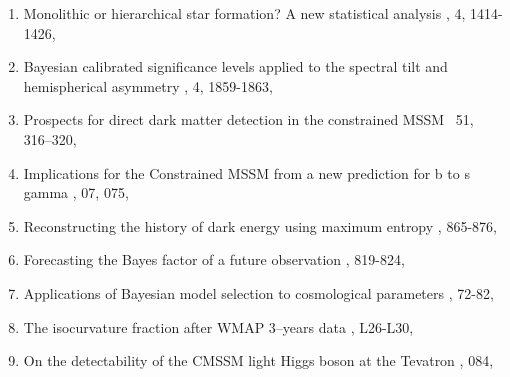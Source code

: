 \begin{enumerate}
\item 
{}
{Monolithic or hierarchical star formation? A new statistical analysis}
{, 4, 1414-1426, }

\item 
{}
{Bayesian calibrated significance levels applied to the spectral tilt and hemispherical asymmetry}
{, 4, 1859-1863, }

\item 
{}
{Prospects for direct dark matter detection in the constrained MSSM}
{\NAR~51, 316–320,  }


\item  
\onestar {}
{Implications for the Constrained MSSM from a new prediction for b to s gamma}
{\JHEP, 07, 075, }

\item 
{}
{Reconstructing the history of dark energy using maximum entropy}
{, 865-876, }

\item 
{}
{Forecasting the Bayes factor of a future observation}
{, 819-824, }

\item \onestar
{}
{Applications of Bayesian model selection to cosmological parameters}
{, 72-82, }

\item 
{}
{The isocurvature fraction after WMAP 3–years data}
{, L26-L30, }

\item 
{}
{On the detectability of the CMSSM light Higgs boson at the Tevatron}
{, 084, }


\end{enumerate}
